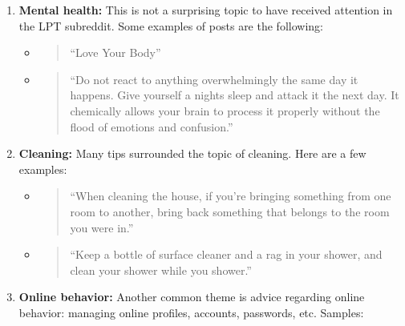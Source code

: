 \documentclass{amsart}
\theoremstyle{definition}
\theoremstyle{remark}
\newcommand{\tql}{\textquotedblleft}
\newcommand{\tqr}{\textquotedblright}
\begin{document}
\begin{enumerate}
\item \textbf{Mental health:} This is not a surprising topic to have received attention in the LPT subreddit.  Some examples of posts are the following:

\begin{itemize}
%

\item \begin{quote}
\tql Love Your Body\tqr
\end{quote}

\item \begin{quote}
\tql Do not react to anything overwhelmingly the same day it happens. Give yourself a nights sleep and attack it the next day. It chemically allows your brain to process it properly without the flood of emotions and confusion.\tqr
\end{quote}

\end{itemize}

\item \textbf{Cleaning:} Many tips surrounded the topic of cleaning.  Here are a few examples:

\begin{itemize}

\item \begin{quote}
\tql When cleaning the house, if you're bringing something from one room to another, bring back something that belongs to the room you were in.\tqr
\end{quote}

\item \begin{quote}
\tql Keep a bottle of surface cleaner and a rag in your shower, and clean your shower while you shower.\tqr
\end{quote}

\end{itemize}

\item \textbf{Online behavior:} Another common theme is advice regarding online behavior: managing online profiles, accounts, passwords, etc.  Samples:


\end{enumerate}
\end{document}
